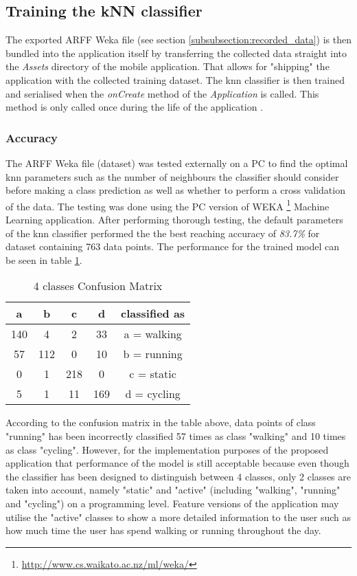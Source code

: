     \subsection{Training the kNN classifier}
    The exported ARFF Weka file (see section \ref{subsubsection:recorded_data}) is then bundled into the application itself by transferring the collected data straight into the \textit{Assets} directory of the mobile application. That allows for "shipping" the application with the collected training dataset. The \gls{knn} classifier is then trained and serialised when the \textit{onCreate} method of the \textit{Application} is called. This method is only called once during the life of the application \citep{googleapplication2017}.
    
    \subsubsection*{Accuracy}
    The ARFF Weka file (dataset) was tested externally on a PC to find the optimal \gls{knn} parameters such as the number of neighbours the classifier should consider before making a class prediction as well as whether to perform a cross validation of the data. The testing was done using the PC version of WEKA \footnote{\url{http://www.cs.waikato.ac.nz/ml/weka/}} Machine Learning application. After performing thorough testing, the default parameters of the \gls{knn} classifier performed the the best reaching accuracy of \textit{83.7\%} for dataset containing 763 data points. The performance for the trained model can be seen in table \ref{table:4_class_confusion_matrix}. 

\begin{table}[ht]
\centering
\begin{tabular}{ |c|c|c|c||c| } 
 \hline
 a & b & c & d & classified as\\
 \hline \hline
 140 & 4 & 2 & 33 & a = walking \\
 57 & 112& 0 & 10 & b = running \\
 0 & 1 & 218 & 0 & c = static \\
 5 & 1 & 11 & 169 & d = cycling \\
 \hline
\end{tabular}
\caption{4 classes Confusion Matrix}
\label{table:4_class_confusion_matrix}
\end{table}

According to the confusion matrix in the table above, data points of class "running" has been incorrectly classified 57 times as class "walking" and 10 times as class "cycling". However, for the implementation purposes of the proposed application that performance of the model is still acceptable because even though the classifier has been designed to distinguish between 4 classes, only 2 classes are taken into account, namely "static" and "active" (including "walking", "running" and "cycling") on a programming level. Feature versions of the application may utilise the "active" classes to show a more detailed information to the user such as how much time the user has spend walking or running throughout the day.

